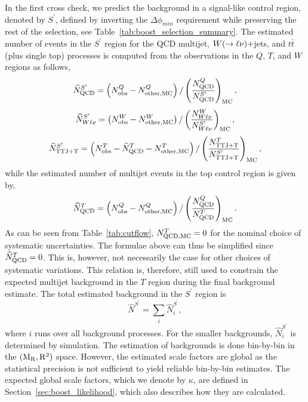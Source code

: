 In the first cross check, we predict the background in a signal-like control region, denoted by
$S^\prime$, defined by inverting the $\Delta\phi_{min}$ requirement while preserving the rest of the
selection, see Table~\ref{tab:boost_selection_summary}. 
The estimated number of events in the $S^\prime$ region for the QCD multijet, $W(\rightarrow
\ell\nu)+$jets, and $t\bar{t}$ (plus single top) processes is computed from the observations in the 
$Q$, $T$, and $W$ regions as follows,
\begin{equation}
 \widehat{N}_{\rm QCD}^{S^\prime} = \left( N_{\rm obs}^{Q} - N_{{\rm other, MC}}^{Q} \right)  /
\left(
\frac{N_{\rm QCD}^{Q}}{N_{\rm QCD}^{S^\prime}} \right)_{\rm MC},
\label{eq:E1}
\end{equation}
\begin{equation}
 \widehat{N}_{W\ell\nu}^{S^\prime} = \left( N_{\rm obs}^{W} - N_{\rm other, MC}^{W} \right) /
\left(
\frac{N_{W\ell\nu}^{W}}{N_{W\ell\nu}^{S^\prime}} \right)_{\rm MC},
\label{eq:E2}
\end{equation}
\begin{equation}
  \widehat{N}_{\rm TTJ+T}^{S^\prime} = \left( N_{\rm obs}^{T} - \widehat{N}_{\rm QCD}^{T} - N_{\rm
other, MC}^{T}
\right) / \left( \frac{N_{\rm TTJ+T}^{T}} {N_{\rm TTJ+T}^{S^\prime}}\right)_{\rm MC},
\label{eq:E3}
\end{equation}
while the estimated number of multijet events in the top control region is given by,
\begin{equation}
 \widehat{N}_{\rm QCD}^{T} = \left( N_{\rm obs}^{Q} - N_{\rm other, MC}^{Q} \right) /  \left(
\frac{N_{\rm QCD}^{Q}}{N_{\rm QCD}^{T}} \right)_{\rm MC}.
\label{eq:E4}
\end{equation}
As can be seen from Table~\ref{tab:cutflow}, $N_{\rm QCD, MC}^{T} = 0$ for the nominal choice
of
systematic uncertainties. The formulae above can thus be simplified since $\widehat{N}_{\rm QCD}^{T}
= 0$. This is, however, not necessarily the case for other choices of systematic variations. This
relation is, therefore, still used to constrain the expected multijet background in the $T$ region
during the final background estimate. 
The total estimated background in the $S^\prime$ region is
\begin{equation}
  \hat{N}^{S^\prime} = \sum_i \hat{N}^{S^\prime}_i , 
\end{equation}
where $i$ runs over all background processes.  For the smaller backgrounds, $\hat{N}^{S^\prime}_i$
is determined by simulation. 
The estimation of backgrounds is done bin-by-bin in the $(\mathrm{M_R},\mathrm{R^2})$ space. 
However, the estimated scale factors are global as the statistical precision is not sufficient to
yield reliable bin-by-bin estimates. The expected global scale factors, which we denote by $\kappa$,
 are defined in Section~\ref{sec:boost_likelihood}, which also describes how they are calculated.

